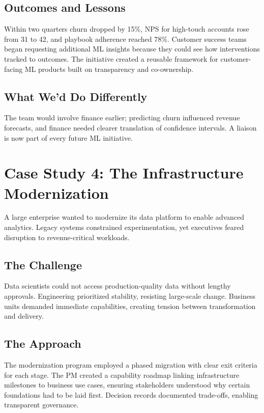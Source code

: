 \subsection{Outcomes and Lessons}
Within two quarters churn dropped by 15\%, NPS for high-touch accounts rose from 31 to 42, and playbook adherence reached 78\%. Customer success teams began requesting additional ML insights because they could see how interventions tracked to outcomes. The initiative created a reusable framework for customer-facing ML products built on transparency and co-ownership.

\subsection{What We'd Do Differently}
The team would involve finance earlier; predicting churn influenced revenue forecasts, and finance needed clearer translation of confidence intervals. A liaison is now part of every future ML initiative.

\section{Case Study 4: The Infrastructure Modernization}
\label{sec:case-infrastructure}

A large enterprise wanted to modernize its data platform to enable advanced analytics. Legacy systems constrained experimentation, yet executives feared disruption to revenue-critical workloads.

\subsection{The Challenge}
Data scientists could not access production-quality data without lengthy approvals. Engineering prioritized stability, resisting large-scale change. Business units demanded immediate capabilities, creating tension between transformation and delivery.

\subsection{The Approach}
The modernization program employed a phased migration with clear exit criteria for each stage. The PM created a capability roadmap linking infrastructure milestones to business use cases, ensuring stakeholders understood why certain foundations had to be laid first. Decision records documented trade-offs, enabling transparent governance.

